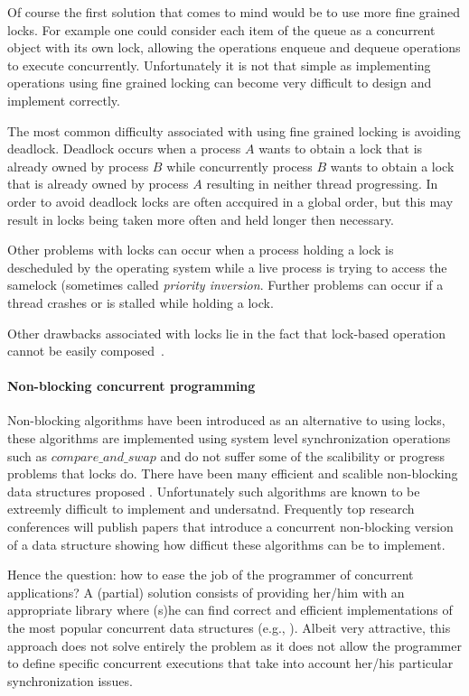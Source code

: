 Of course the first solution that comes to mind would be to
use more fine grained locks.  For example one could consider
each item of the queue as  a concurrent object with its own lock,
allowing the  operations  enqueue  
and  dequeue  operations to execute concurrently.
Unfortunately it is not that simple as implementing operations using
fine grained locking can  become very   difficult  to  design and implement
correctly.

The most common difficulty associated with using fine grained locking
is avoiding deadlock.
Deadlock occurs when a process $A$ wants to obtain a lock that
is already owned by process $B$ while concurrently process $B$ wants
to obtain a lock that is already owned by process $A$ resulting
in neither thread progressing.
In order to avoid deadlock locks are often accquired in a global order,
but this may result in locks being taken more often and held longer then necessary.

Other problems with locks can occur when a process holding a lock
is descheduled by the operating system while a live process is trying to
access the samelock (sometimes called \emph{priority inversion}.
Further problems can occur if a thread crashes or is stalled while
holding a lock.

Other drawbacks associated with locks lie in the fact that 
lock-based operation cannot be easily composed~\cite{HMPH05,GG11}.


\paragraph{Non-blocking concurrent programming}
Non-blocking algorithms \cite{GC96} have been introduced as an alternative to using
locks, these algorithms are implemented using system level synchronization operations such
as $compare\_and\_swap$ and do not suffer some of the scalibility or progress
problems that locks do.
There have been many efficient and scalible non-blocking data structures proposed
\cite{Mic02,ST04,Val96,FR04,Fra03}.
Unfortunately such algorithms are known to be extreemly difficult to implement
and undersatnd.
Frequently top research conferences will publish papers that introduce
a concurrent non-blocking version of a data structure showing how
difficut these algorithms can be to implement.

Hence  the question:  how to  ease  the  job of  the programmer  of
concurrent applications?
A (partial)  solution consists of providing her/him with an appropriate 
library where  (s)he  can  find  correct  and  efficient  implementations  of  
the most popular concurrent data structures (e.g., \cite{HS08,MS96}). 
Albeit very attractive, this approach does not solve entirely the problem  
as it does not allow the programmer to define  specific concurrent executions 
that take into account  her/his particular  synchronization issues. 



